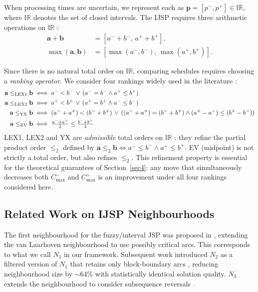 \documentclass[preprint,12pt]{elsarticle}
\begin{document}
When processing times are uncertain, we represent each as $\mathbf{p}=[p^-, p^+] \in \mathbb{IR}$, where $\mathbb{IR}$ denotes the set of closed intervals. The IJSP requires three arithmetic operations on $\mathbb{IR}$ \cite{Moore2009}:
\begin{align}
\mathbf{a} + \mathbf{b}        &= [a^- + b^-,\, a^+ + b^+], \\
\max(\mathbf{a},\mathbf{b})    &= [\max(a^-,b^-),\, \max(a^+,b^+)].
\end{align}

Since there is no natural total order on $\mathbb{IR}$, comparing schedules requires choosing a \emph{ranking operator}. We consider four rankings widely used in the literature \cite{Bustince2013,Xu2006,Lei2012c}:
\begin{align}
\mathbf{a} \leq_{\rm LEX1} \mathbf{b} &\iff a^- < b^- \,\vee\, (a^- = b^- \wedge a^+ \leq b^+) \\
\mathbf{a} \leq_{\rm LEX2} \mathbf{b} &\iff a^+ < b^+ \,\vee\, (a^+ = b^+ \wedge a^- \leq b^-) \\
\mathbf{a} \leq_{\rm YX}   \mathbf{b} &\iff (a^- + a^+) < (b^- + b^+) \,\vee\, ((a^- + a^+) = (b^- + b^+) \wedge (a^+ - a^-) \leq (b^+ - b^-)) \\
\mathbf{a} \leq_{\rm EV}   \mathbf{b} &\iff \tfrac{a^- + a^+}{2} \leq \tfrac{b^- + b^+}{2}
\end{align}
LEX1, LEX2 and YX are \emph{admissible} total orders on $\mathbb{IR}$ \cite{Bustince2013}: they refine the partial product order $\leq_{2}$ defined by $\mathbf{a} \leq_{2} \mathbf{b} \iff a^- \leq b^- \wedge a^+ \leq b^+$. EV (midpoint) is not strictly a total order, but also refines $\leq_{2}$. This refinement property is essential for the theoretical guarantees of Section~\ref{sec4}: any move that simultaneously decreases both $C^-_{\max}$ and $C^+_{\max}$ is an improvement under all four rankings considered here.

\subsection{Related Work on IJSP Neighbourhoods}
\label{sec2.3}

The first neighbourhood for the fuzzy/interval JSP was proposed in \cite{GonzalezRodriguez2008}, extending the van Laarhoven neighbourhood \cite{vanLaarhoven1992} to use possibly critical arcs. This corresponds to what we call $N_1$ in our framework. Subsequent work introduced $N_2$ as a filtered version of $N_1$ that retains only block-boundary arcs \cite{N2fjsp}, reducing neighbourhood size by $\sim$64\% with statistically identical solution quality. $N_3$ extends the neighbourhood to consider subsequence reversals \cite{N3fjsp}.
\end{document}

